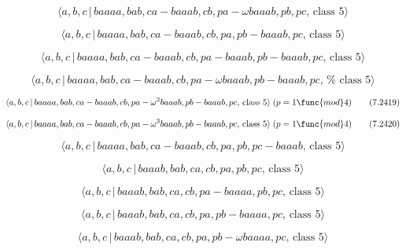 \documentclass[10pt]{article}
\begin{document}
\begin{equation}
\langle a,b,c\,|\,baaaa,bab,ca-baaab,cb,pa-\omega baaab,pb,pc,\,\text{class }%
5\rangle  \tag{7.2415}
\end{equation}

\begin{equation}
\langle a,b,c\,|\,baaaa,bab,ca-baaab,cb,pa,pb-baaab,pc,\,\text{class }%
5\rangle  \tag{7.2416}
\end{equation}

\begin{equation}
\langle a,b,c\,|\,baaaa,bab,ca-baaab,cb,pa-baaab,pb-baaab,pc,\,\text{class }%
5\rangle  \tag{7.2417}
\end{equation}

\begin{equation}
\langle a,b,c\,|\,baaaa,bab,ca-baaab,cb,pa-\omega baaab,pb-baaab,pc,\,\text{%
class }5\rangle  \tag{7.2418}
\end{equation}

\begin{equation}
\langle a,b,c\,|\,baaaa,bab,ca-baaab,cb,pa-\omega ^{2}baaab,pb-baaab,pc,\,%
\text{class }5\rangle \;(p=1\func{mod}4)  \tag{7.2419}
\end{equation}

\begin{equation}
\langle a,b,c\,|\,baaaa,bab,ca-baaab,cb,pa-\omega ^{3}baaab,pb-baaab,pc,\,%
\text{class }5\rangle \;(p=1\func{mod}4)  \tag{7.2420}
\end{equation}

\begin{equation}
\langle a,b,c\,|\,baaaa,bab,ca-baaab,cb,pa,pb,pc-baaab,\,\text{class }%
5\rangle  \tag{7.2421}
\end{equation}

\begin{equation}
\langle a,b,c\,|\,baaab,bab,ca,cb,pa,pb,pc,\,\text{class }5\rangle 
\tag{7.2422}
\end{equation}

\begin{equation}
\langle a,b,c\,|\,baaab,bab,ca,cb,pa-baaaa,pb,pc,\,\text{class }5\rangle 
\tag{7.2423}
\end{equation}

\begin{equation}
\langle a,b,c\,|\,baaab,bab,ca,cb,pa,pb-baaaa,pc,\,\text{class }5\rangle 
\tag{7.2424}
\end{equation}

\begin{equation}
\langle a,b,c\,|\,baaab,bab,ca,cb,pa,pb-\omega baaaa,pc,\,\text{class }%
5\rangle  \tag{7.2425}
\end{equation}
\end{document}
